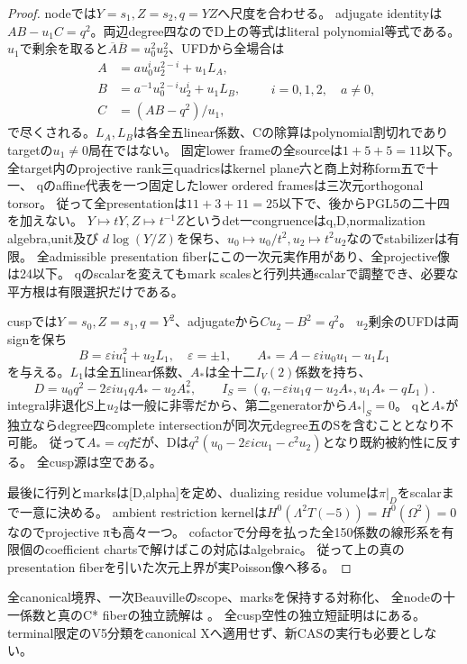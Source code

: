 \documentclass[a4paper,11pt]{ltjsarticle}
\theoremstyle{definition}
\begin{document}
\begin{proof}
nodeでは$Y=s_1,Z=s_2,q=YZ$へ尺度を合わせる。
adjugate identityは$AB-u_1C=q^2$。両辺degree四なのでD上の等式はliteral polynomial等式である。
$u_1$で剰余を取ると$\overline A\overline B=u_0^2u_2^2$、UFDから全場合は
\[
 \begin{split}
 A&=a u_0^i u_2^{2-i}+u_1L_A,\\
 B&=a^{-1}u_0^{2-i}u_2^i+u_1L_B,\\
 C&=(AB-q^2)/u_1,
 \end{split}\qquad i=0,1,2,\quad a\ne0,
\]
で尽くされる。$L_A,L_B$は各全五linear係数、Cの除算はpolynomial割切れでありtargetの$u_1\ne0$局在ではない。
固定lower frameの全sourceは$1+5+5=11$以下。
全target内のprojective rank三quadricsはkernel plane六と商上対称form五で十一、
qのaffine代表を一つ固定したlower ordered framesは三次元orthogonal torsor。
従って全presentationは$11+3+11=25$以下で、後からPGL5の二十四を加えない。
$Y\mapsto tY,Z\mapsto t^{-1}Z$というdet一congruenceはq,D,normalization algebra,unit及び
$d\log(Y/Z)$を保ち、$u_0\mapsto u_0/t^2,u_2\mapsto t^2u_2$なのでstabilizerは有限。
全admissible presentation fiberにこの一次元実作用があり、全projective像は24以下。
qのscalarを変えてもmark scalesと行列共通scalarで調整でき、必要な平方根は有限選択だけである。

cuspでは$Y=s_0,Z=s_1,q=Y^2$、adjugateから$Cu_2-B^2=q^2$。
$u_2$剰余のUFDは両signを保ち
\[
 B=\varepsilon i u_1^2+u_2L_1,\quad\varepsilon=\pm1,\qquad
 A_*=A-\varepsilon i u_0u_1-u_1L_1
\]
を与える。$L_1$は全五linear係数、$A_*$は全十二$I_V(2)$係数を持ち、
\[
 D=u_0q^2-2\varepsilon i u_1qA_*-u_2A_*^2,\qquad
 I_S=(q,-\varepsilon i u_1q-u_2A_*,u_1A_*-qL_1).
\]
integral非退化S上$u_2$は一般に非零だから、第二generatorから$A_*|_S=0$。
qと$A_*$が独立ならdegree四complete intersectionが同次元degree五のSを含むこととなり不可能。
従って$A_*=cq$だが、Dは$q^2(u_0-2\varepsilon i c u_1-c^2u_2)$となり既約被約性に反する。
全cusp源は空である。

最後に行列とmarksは[D,alpha]を定め、dualizing residue volumeは$\pi|_D$をscalarまで一意に決める。
ambient restriction kernelは$H^0(\Lambda^2T(-5))=H^0(\Omega^2)=0$なのでprojective πも高々一つ。
cofactorで分母を払った全150係数の線形系を有限個のcoefficient chartsで解けばこの対応はalgebraic。
従って上の真のpresentation fiberを引いた次元上界が実Poisson像へ移る。
\end{proof}
全canonical境界、一次Beauvilleのscope、marksを保持する対称化、
全nodeの十一係数と真のC* fiberの独立読解は
。
全cusp空性の独立短証明はにある。
terminal限定のV5分類をcanonical Xへ適用せず、新CASの実行も必要としない。
\end{document}

